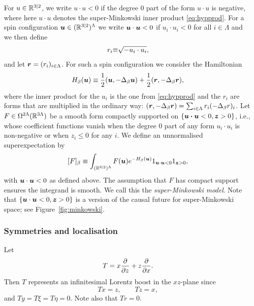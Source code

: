 \documentclass[11pt,a4paper]{article}
\begin{document}
For $u \in \mathbb{R}^{3|2}$, we write $u\cdot u< 0$ if the degree $0$ part
of the form $u\cdot u$ is negative,
where here $u\cdot u$ denotes the super-Minkowski inner product \eqref{eq:hypprod}.
For a spin configuration
$\boldsymbol{u} \in (\mathbb{R}^{3|2})^\Lambda$ we write $\boldsymbol{u} \cdot \boldsymbol{u} < 0$ if
$u_i\cdot u_i< 0$ for all $i\in\Lambda$ and we then define
\begin{equation}
  r_i {\equiv} 
  \sqrt{-u_i\cdot u_i},
\end{equation}
and let $\boldsymbol{r} = (r_{i})_{i\in\Lambda}$.
For such a spin configuration we consider the Hamiltonian
\begin{equation}
\label{eq:H22-unconstrained}
H_{\beta}(\boldsymbol{u})
\equiv
\frac{1}{2}(\boldsymbol{u},-\Delta_{\beta}\boldsymbol{u})
+\frac{1}{2}(\boldsymbol{r},-\Delta_{\beta}\boldsymbol{r}),
\end{equation}
where the inner product for the $u_i$ is the one from \eqref{eq:hypprod}
and the $r_i$ are forms that are multiplied in the ordinary way:
$(\boldsymbol{r},-\Delta_{\beta}\boldsymbol{r}) = \sum_{i\in\Lambda}r_{i}(-\Delta_{\beta}r)_{i}$. 
Let $F\in \Omega^{2\Lambda}(\mathbb{R}^{3\Lambda})$ be a smooth form compactly
supported on $\{\boldsymbol{u\cdot u}<0,\boldsymbol{z}>0\}$, i.e., whose coefficient functions
vanish when the degree $0$ part of any form $u_{i}\cdot u_{i}$ is
non-negative or when $z_{i}\leq 0$ for any $i$.
We define an unnormalised superexpectation by
\begin{equation}
\label{eq:SUSY-Uhyp2}
[F]_\beta \equiv \int_{(\mathbb{R}^{3|2})^\Lambda} 
F(\boldsymbol{u}) e^{-H_\beta(\boldsymbol{u})} 1_{\boldsymbol{u}\cdot \boldsymbol{u}<0} 1_{\boldsymbol{z}>0},
\end{equation}
with $\boldsymbol{u}\cdot \boldsymbol{u}<0$ as defined above. The assumption that
$F$ has compact support ensures the integrand is smooth.
We call this the \emph{super-Minkowski model}.
Note that $\{\boldsymbol{u}\cdot \boldsymbol{u} <0,\boldsymbol{z}>0\}$ is a version of the
causal future for super-Minkowski space; see
Figure~\ref{fig:minkowski}.


\subsubsection{Symmetries and localisation}

Let
\begin{equation}
  T = x \frac{\partial }{\partial z} + z \frac{\partial }{\partial x}.
\end{equation}
Then $T$ represents an infinitesimal Lorentz boost in the $xz$-plane since
\begin{equation}
  T x = z, \qquad Tz = x, 
\end{equation}
and $T y = T \xi = T \eta = 0$. Note also that $T r = 0$.
\end{document}
